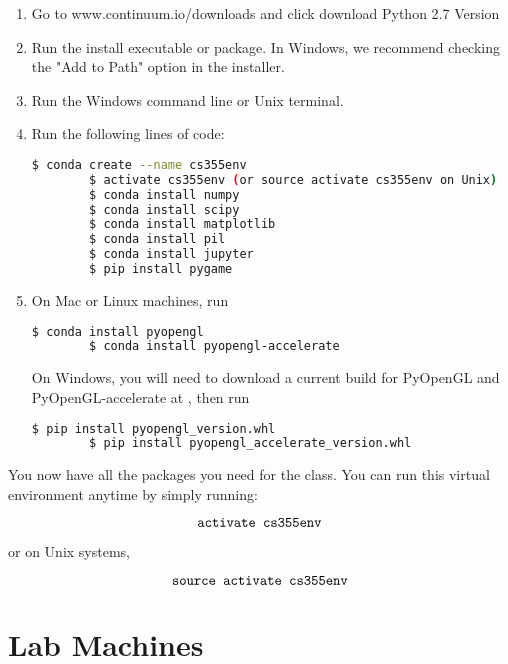 \documentclass[11pt]{article}
\begin{document}
\begin{enumerate}
    \item   Go to www.continuum.io/downloads and click download Python 2.7 Version
    \item   Run the install executable or package. In Windows, we recommend checking the "Add to Path" option in the installer.
    \item   Run the  Windows command line or Unix terminal.
    \item   Run the following lines of code:

    \begin{lstlisting}[language=bash]
        $ conda create --name cs355env
        $ activate cs355env (or source activate cs355env on Unix)
        $ conda install numpy
        $ conda install scipy
        $ conda install matplotlib
        $ conda install pil
        $ conda install jupyter
        $ pip install pygame
    \end{lstlisting}


    \item   On Mac or Linux machines, run

    \begin{lstlisting}[language=bash]
        $ conda install pyopengl
        $ conda install pyopengl-accelerate
    \end{lstlisting}

    On Windows, you will need to download a current build for PyOpenGL and PyOpenGL-accelerate at , then run
    \begin{lstlisting}[language=bash]
        $ pip install pyopengl_version.whl
        $ pip install pyopengl_accelerate_version.whl
    \end{lstlisting}

\end{enumerate}

You now have all the packages you need for the class. You can run this virtual environment anytime by simply running:

\[
	\mbox{\tt activate cs355env}
\]

or on Unix systems,

\[
	\mbox{\tt source activate cs355env}
\]

\divider

\section*{Lab Machines}
\end{document}

